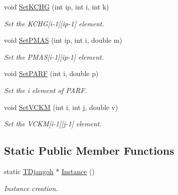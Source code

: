 \begin{DoxyCompactItemize}
void \hyperlink{class_t_djangoh_ac82d4f50980416893c9b1504247fe47f}{Set\+K\+C\+H\+G} (int ip, int i, int k)
\begin{DoxyCompactList}\small\item\em Set the K\+C\+H\+G\mbox{[}i-\/1\mbox{]}\mbox{[}ip-\/1\mbox{]} element. \end{DoxyCompactList}\item 
void \hyperlink{class_t_djangoh_a9e7308dceed0b17d8a61dd1018323b60}{Set\+P\+M\+A\+S} (int ip, int i, double m)
\begin{DoxyCompactList}\small\item\em Set the P\+M\+A\+S\mbox{[}i-\/1\mbox{]}\mbox{[}ip-\/1\mbox{]} element. \end{DoxyCompactList}\item 
void \hyperlink{class_t_djangoh_a351dee78b1ea5d9014e7913f52518cd9}{Set\+P\+A\+R\+F} (int i, double p)
\begin{DoxyCompactList}\small\item\em Set the i element of P\+A\+R\+F. \end{DoxyCompactList}\item 
void \hyperlink{class_t_djangoh_a8aea0e0f7735a1e457c7b30923d89bff}{Set\+V\+C\+K\+M} (int i, int j, double v)
\begin{DoxyCompactList}\small\item\em Set the V\+C\+K\+M\mbox{[}i-\/1\mbox{]}\mbox{[}j-\/1\mbox{]} element. \end{DoxyCompactList}\end{DoxyCompactItemize}
\subsection*{Static Public Member Functions}
\begin{DoxyCompactItemize}
\item 
static \hyperlink{class_t_djangoh}{T\+Djangoh} $\ast$ \hyperlink{class_t_djangoh_a2e9871b8bec6326bb518f218dc87402c}{Instance} ()
\begin{DoxyCompactList}\small\item\em Instance creation. \end{DoxyCompactList}\end{DoxyCompactItemize}
